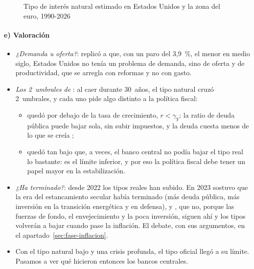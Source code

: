 \documentclass[11pt]{article}
\begin{document}
\begin{figure}[H]
\centering
\caption{Tipo de interés natural estimado en Estados Unidos y la zona del euro, 1990-2026}\label{fig:tipo-natural}
\end{figure}

\paragraph{e) Valoración}

\begin{itemize}
\item \emph{¿Demanda u oferta?}: \textcite{Cochrane2019Summers} replicó a  que, con un paro del 3,9~\%, el menor en medio siglo, Estados Unidos no tenía un problema de demanda, sino de oferta y de productividad, que se arregla con reformas y no con gasto.
\item \emph{Los 2~umbrales de }: al caer durante 30~años, el tipo natural cruzó 2~umbrales, y cada uno pide algo distinto a la política fiscal\nocite{Blanchard2021LowRates,Blanchard2023Fiscal}:
  \begin{itemize}
  \item quedó por debajo de la tasa de crecimiento, $r<\gamma_Y$: la ratio de deuda pública puede bajar sola, sin subir impuestos, y la deuda cuesta menos de lo que se creía ;
  \item quedó tan bajo que, a veces, el banco central no podía bajar el tipo real lo bastante: es el límite inferior, y por eso la política fiscal debe tener un papel mayor en la estabilización.
  \end{itemize}
\item \emph{¿Ha terminado?}: desde 2022 los tipos reales han subido. En 2023  sostuvo que la era del estancamiento secular había terminado (más deuda pública, más inversión en la transición energética y en defensa), y , que no, porque las fuerzas de fondo, el envejecimiento y la poca inversión, siguen ahí y los tipos volverán a bajar cuando pase la inflación\nocite{Blanchard2023Secular,PIIE2023Debate}. El debate, con sus argumentos, en el apartado~\ref{sec:fase-inflacion}.
\item Con el tipo natural bajo y una crisis profunda, el tipo oficial llegó a su límite. Pasamos a ver qué hicieron entonces los bancos centrales.
\end{itemize}
\end{document}
